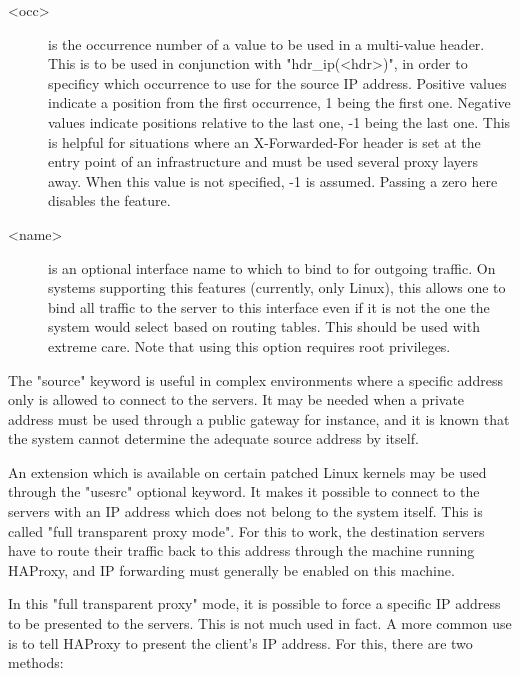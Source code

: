 \begin{description}
  \item[<occ>] is the occurrence number of a value to be used in a multi-value
              header. This is to be used in conjunction with "hdr\_ip(<hdr>)",
              in order to specificy which occurrence to use for the source IP
              address. Positive values indicate a position from the first
              occurrence, 1 being the first one. Negative values indicate
              positions relative to the last one, -1 being the last one. This
              is helpful for situations where an X-Forwarded-For header is set
              at the entry point of an infrastructure and must be used several
              proxy layers away. When this value is not specified, -1 is
              assumed. Passing a zero here disables the feature.

  \item[<name>] is an optional interface name to which to bind to for outgoing
              traffic. On systems supporting this features (currently, only
              Linux), this allows one to bind all traffic to the server to
              this interface even if it is not the one the system would select
              based on routing tables. This should be used with extreme care.
              Note that using this option requires root privileges.
  \end{description}

  The "source" keyword is useful in complex environments where a specific
  address only is allowed to connect to the servers. It may be needed when a
  private address must be used through a public gateway for instance, and it is
  known that the system cannot determine the adequate source address by itself.

  An extension which is available on certain patched Linux kernels may be used
  through the "usesrc" optional keyword. It makes it possible to connect to the
  servers with an IP address which does not belong to the system itself. This
  is called "full transparent proxy mode". For this to work, the destination
  servers have to route their traffic back to this address through the machine
  running HAProxy, and IP forwarding must generally be enabled on this machine.

  In this "full transparent proxy" mode, it is possible to force a specific IP
  address to be presented to the servers. This is not much used in fact. A more
  common use is to tell HAProxy to present the client's IP address. For this,
  there are two methods:

